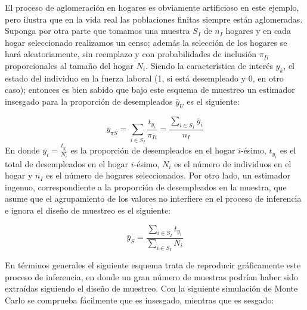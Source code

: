 \documentclass[
  spanish,
  12pt,
]{book}
\begin{document}
El proceso de aglomeración en hogares es obviamente artificioso en este ejemplo, pero ilustra que en la vida real las poblaciones finitas siempre están aglomeradas. Suponga por otra parte que tomamos una muestra \(S_{I}\) de \(n_{I}\) hogares y en cada hogar seleccionado realizamos un censo; además la selección de los hogares se hará aleatoriamente, sin reemplazo y con probabilidades de inclusión \(\pi_{Ii}\) proporcionales
al tamaño del hogar \(N_{i}\). Siendo la característica de interés \(y_{k}\), el estado del individuo en la fuerza laboral (1, si está desempleado y 0, en otro caso); entonces es bien sabido que bajo este esquema de muestreo un estimador insesgado para la proporción de desempleados \(\bar{y}_{U}\) es el siguiente:

\[
\bar{y}_{\pi S}=\sum_{i\in S_{I}}\frac{t_{y_{i}}}{\pi_{Ii}}=\frac{\sum_{i\in S_{I}}\bar{y}_{i}}{n_{I}}
\]
En donde \(\bar{y}_{i}=\frac{t_{y_{i}}}{N_{i}}\) es la proporción de desempleados en el hogar \(i\)-ésimo, \(t_{y_{i}}\) es el total de desempleados en el hogar \(i\)-ésimo, \(N_{i}\) es el número de individuos en el hogar y \(n_{I}\) es el número de hogares seleccionados. Por otro lado, un estimador ingenuo, correspondiente a la proporción de desempleados
en la muestra, que asume que el agrupamiento de los valores no interfiere
en el proceso de inferencia e ignora el diseño de muestreo es el siguiente:

\[
\bar{y}_{S}=\frac{\sum_{i\in S_{I}}t_{y_{i}}}{\sum_{i\in S_{I}}N_{i}}
\]

En términos generales el siguiente esquema trata de reproducir gráficamente este proceso de inferencia, en donde un gran número de muestras podrían haber sido extraídas siguiendo el diseño de muestreo. Con la siguiente simulación de Monte Carlo se comprueba fácilmente que es insesgado, mientras que es sesgado:
\end{document}
